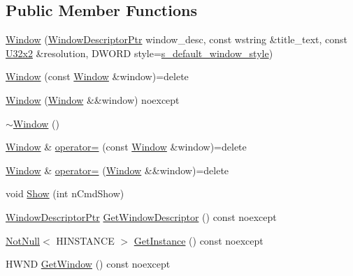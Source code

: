 \subsection*{Public Member Functions}
\begin{DoxyCompactItemize}
\item 
\mbox{\hyperlink{classmage_1_1_window_a0ac19cbc7adf4aa0ed39e29244a65b57}{Window}} (\mbox{\hyperlink{classmage_1_1_window_ac41b052d8e8dd0571b3ec862e8f6da05}{Window\+Descriptor\+Ptr}} window\+\_\+desc, const wstring \&title\+\_\+text, const \mbox{\hyperlink{namespacemage_a31f2bb52b5080e706e1c13de07c0a249}{U32x2}} \&resolution, D\+W\+O\+RD style=\mbox{\hyperlink{classmage_1_1_window_ac680bdd3d5359f66b2dea082ef45e0da}{s\+\_\+default\+\_\+window\+\_\+style}})
\item 
\mbox{\hyperlink{classmage_1_1_window_a910a63ff907559e693cb9abd3539523e}{Window}} (const \mbox{\hyperlink{classmage_1_1_window}{Window}} \&window)=delete
\item 
\mbox{\hyperlink{classmage_1_1_window_a32878487dd2e2f46eaaf97aaf220ee33}{Window}} (\mbox{\hyperlink{classmage_1_1_window}{Window}} \&\&window) noexcept
\item 
\mbox{\hyperlink{classmage_1_1_window_a71d3ce0b3141e89121ae09e8fc64a217}{$\sim$\+Window}} ()
\item 
\mbox{\hyperlink{classmage_1_1_window}{Window}} \& \mbox{\hyperlink{classmage_1_1_window_ab62aeec5dee0c36b9926894e2684ff3d}{operator=}} (const \mbox{\hyperlink{classmage_1_1_window}{Window}} \&window)=delete
\item 
\mbox{\hyperlink{classmage_1_1_window}{Window}} \& \mbox{\hyperlink{classmage_1_1_window_aa52284540a75c98a2aa768a5d6410378}{operator=}} (\mbox{\hyperlink{classmage_1_1_window}{Window}} \&\&window)=delete
\item 
void \mbox{\hyperlink{classmage_1_1_window_a017de58a756a2cc4dde0ccb3caf589ff}{Show}} (int n\+Cmd\+Show)
\item 
\mbox{\hyperlink{classmage_1_1_window_ac41b052d8e8dd0571b3ec862e8f6da05}{Window\+Descriptor\+Ptr}} \mbox{\hyperlink{classmage_1_1_window_add5b20d191810ba04000728c7517543f}{Get\+Window\+Descriptor}} () const noexcept
\item 
\mbox{\hyperlink{namespacemage_a8769f9d670d6b585ea306cb1062af94b}{Not\+Null}}$<$ H\+I\+N\+S\+T\+A\+N\+CE $>$ \mbox{\hyperlink{classmage_1_1_window_a809eff149af9fd2e66eec176078d0127}{Get\+Instance}} () const noexcept
\item 
H\+W\+ND \mbox{\hyperlink{classmage_1_1_window_a0f791c3fb8f5be34a17ae2a93767a613}{Get\+Window}} () const noexcept

\end{DoxyCompactItemize}
